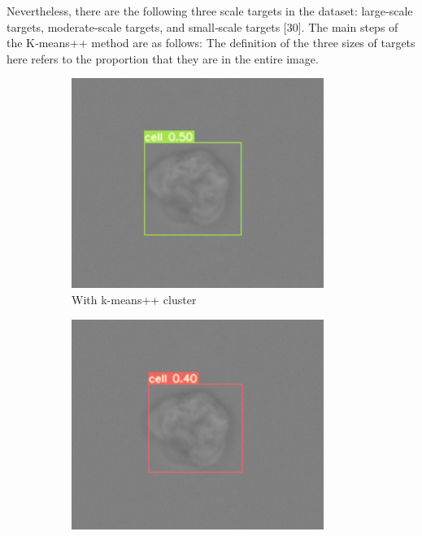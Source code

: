 Nevertheless, there are the following three scale targets in the dataset: large‐scale targets, moderate‐scale targets, and small‐scale targets [30]. The main steps of the K‐means++ method are as follows:  The definition of the three sizes of targets here refers to the proportion that they are in the entire image.
\begin{figure}[h]
	\begin{center}
		\begin{subfigure}[b]{0.49\textwidth}
		    \centering
			\includegraphics[width=0.9\textwidth]{thesis-template-master/images/withkmean.png}
			\caption{With k-means++ cluster}
			\label{fig:cellnet}
		\end{subfigure}
		\begin{subfigure}[b]{0.49\textwidth}
		    \centering
			\includegraphics[width=0.9\textwidth]{thesis-template-master/images/withoutkmean.png}

\end{subfigure}
\end{center}
\end{figure}

